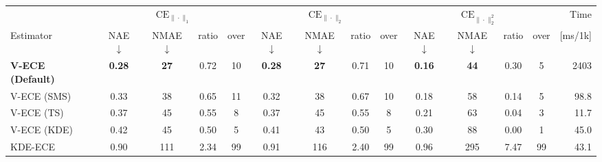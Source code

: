 \begin{tabular}{l cccc cccc cccc r}
\toprule
& \multicolumn{4}{c}{$\mathrm{CE}_{\|\cdot\|_1}$} & \multicolumn{4}{c}{$\mathrm{CE}_{\|\cdot\|_2}$} & \multicolumn{4}{c}{$\mathrm{CE}_{\|\cdot\|_2^2}$} & Time \\
\cmidrule(lr){2-5} \cmidrule(lr){6-9} \cmidrule(lr){10-13}
Estimator & NAE $\downarrow$ & NMAE $\downarrow$ & ratio & over & NAE $\downarrow$ & NMAE $\downarrow$ & ratio & over & NAE $\downarrow$ & NMAE $\downarrow$ & ratio & over & [ms/1k] \\
\midrule
\textbf{V-ECE (Default)} & \textbf{0.28} & \textbf{27} & 0.72 & 10 & \textbf{0.28} & \textbf{27} & 0.71 & 10 & \textbf{0.16} & \textbf{44} & 0.30 & 5 & 2403 \\
V-ECE (SMS) & 0.33 & 38 & 0.65 & 11 & 0.32 & 38 & 0.67 & 10 & 0.18 & 58 & 0.14 & 5 & 98.8 \\
V-ECE (TS) & 0.37 & 45 & 0.55 & 8 & 0.37 & 45 & 0.55 & 8 & 0.21 & 63 & 0.04 & 3 & 11.7 \\
V-ECE (KDE) & 0.42 & 45 & 0.50 & 5 & 0.41 & 43 & 0.50 & 5 & 0.30 & 88 & 0.00 & 1 & 45.0 \\
KDE-ECE & 0.90 & 111 & 2.34 & 99 & 0.91 & 116 & 2.40 & 99 & 0.96 & 295 & 7.47 & 99 & 43.1 \\
\bottomrule
\end{tabular}
